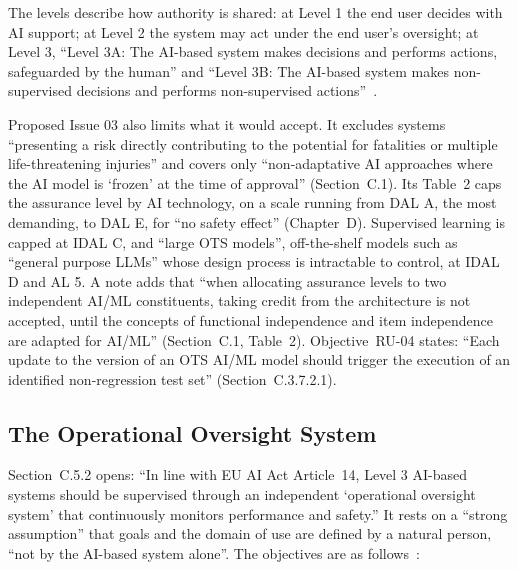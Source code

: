 \documentclass{aer}
\begin{document}
The levels describe how authority is shared: at Level 1 the end user decides with AI support; at Level 2 the system may act under the end user's oversight; at Level 3, ``Level 3A: The AI-based system makes decisions and performs actions, safeguarded by the human'' and ``Level 3B: The AI-based system makes non-supervised decisions and performs non-supervised actions''~\citep[Figure~4]{easa2026concept}.

Proposed Issue 03 also limits what it would accept. It excludes systems ``presenting a risk directly contributing to the potential for fatalities or multiple life-threatening injuries'' and covers only ``non-adaptative AI approaches where the AI model is `frozen' at the time of approval'' (Section~C.1). Its Table~2 caps the assurance level by AI technology, on a scale running from DAL A, the most demanding, to DAL E, for ``no safety effect'' (Chapter~D). Supervised learning is capped at IDAL C, and ``large OTS models'', off-the-shelf models such as ``general purpose LLMs'' whose design process is intractable to control, at IDAL D and AL 5. A note adds that ``when allocating assurance levels to two independent AI/ML constituents, taking credit from the architecture is not accepted, until the concepts of functional independence and item independence are adapted for AI/ML'' (Section~C.1, Table~2). Objective~RU-04 states: ``Each update to the version of an OTS AI/ML model should trigger the execution of an identified non-regression test set'' (Section~C.3.7.2.1).

\subsection{The Operational Oversight System}\label{sec:oos}

Section~C.5.2 opens: ``In line with EU AI Act Article~14, Level 3 AI-based systems should be supervised through an independent `operational oversight system' that continuously monitors performance and safety.'' It rests on a ``strong assumption'' that goals and the domain of use are defined by a natural person, ``not by the AI-based system alone''. The objectives are as follows~\citep[Section~C.5.2]{easa2026concept}:
\end{document}

